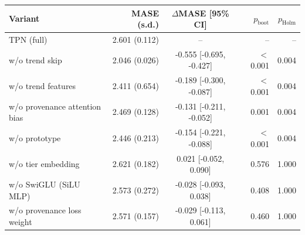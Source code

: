 \begin{tabular}{@{}lrcrr@{}}
\toprule
Variant & MASE (s.d.) & $\Delta$MASE [95\% CI] & $p_{\mathrm{boot}}$ & $p_{\mathrm{Holm}}$ \\
\midrule
TPN (full) & 2.601 (0.112) & -- & -- & -- \\
w/o trend skip & 2.046 (0.026) & -0.555 [-0.695, -0.427] & $<$0.001 & 0.004 \\
w/o trend features & 2.411 (0.654) & -0.189 [-0.300, -0.087] & $<$0.001 & 0.004 \\
w/o provenance attention bias & 2.469 (0.128) & -0.131 [-0.211, -0.052] & 0.001 & 0.004 \\
w/o prototype & 2.446 (0.213) & -0.154 [-0.221, -0.088] & $<$0.001 & 0.004 \\
w/o tier embedding & 2.621 (0.182) & 0.021 [-0.052, 0.090] & 0.576 & 1.000 \\
w/o SwiGLU (SiLU MLP) & 2.573 (0.272) & -0.028 [-0.093, 0.038] & 0.408 & 1.000 \\
w/o provenance loss weight & 2.571 (0.157) & -0.029 [-0.113, 0.061] & 0.460 & 1.000 \\
\bottomrule
\end{tabular}
